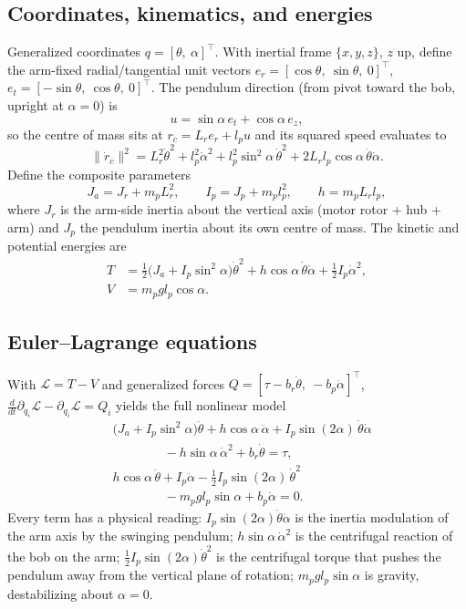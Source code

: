 \documentclass[conference]{IEEEtran}
\begin{document}
\subsection{Coordinates, kinematics, and energies}
Generalized coordinates $q = [\theta,\ \alpha]^{\!\top}$. With inertial frame $\{x,y,z\}$, $z$ up, define the arm-fixed radial/tangential unit vectors $e_r = [\cos\theta,\ \sin\theta,\ 0]^{\!\top}$, $e_t = [-\sin\theta,\ \cos\theta,\ 0]^{\!\top}$. The pendulum direction (from pivot toward the bob, upright at $\alpha=0$) is
\begin{equation}
u = \sin\alpha\, e_t + \cos\alpha\, e_z ,
\end{equation}
so the centre of mass sits at $r_c = L_r e_r + l_p u$ and its squared speed evaluates to
\begin{equation}
\|\dot r_c\|^2 = L_r^2\dot\theta^2 + l_p^2\dot\alpha^2 + l_p^2\sin^2\!\alpha\,\dot\theta^2 + 2L_r l_p\cos\alpha\,\dot\theta\dot\alpha .
\end{equation}
Define the composite parameters
\begin{equation}
J_a = J_r + m_p L_r^2,\qquad
I_p = J_p + m_p l_p^2,\qquad
h = m_p L_r l_p,
\label{eq:composite}
\end{equation}
where $J_r$ is the arm-side inertia about the vertical axis (motor rotor + hub + arm) and $J_p$ the pendulum inertia about its own centre of mass. The kinetic and potential energies are
\begin{align}
T &= \tfrac12\bigl(J_a + I_p\sin^2\!\alpha\bigr)\dot\theta^2 + h\cos\alpha\,\dot\theta\dot\alpha + \tfrac12 I_p\dot\alpha^2, \label{eq:T}\\
V &= m_p g l_p \cos\alpha .\label{eq:V}
\end{align}

\subsection{Euler--Lagrange equations}
With $\mathcal L = T - V$ and generalized forces $Q = [\tau - b_r\dot\theta,\ -b_p\dot\alpha]^{\!\top}$, $\frac{d}{dt}\partial_{\dot q_i}\mathcal L - \partial_{q_i}\mathcal L = Q_i$ yields the full nonlinear model
\begin{align}
&\bigl(J_a + I_p\sin^2\!\alpha\bigr)\ddot\theta + h\cos\alpha\,\ddot\alpha
+ I_p\sin(2\alpha)\,\dot\theta\dot\alpha \nonumber\\
&\qquad\qquad - h\sin\alpha\,\dot\alpha^2 + b_r\dot\theta = \tau,
\label{eq:nl1}\\[2pt]
&h\cos\alpha\,\ddot\theta + I_p\ddot\alpha - \tfrac12 I_p\sin(2\alpha)\,\dot\theta^2 \nonumber\\
&\qquad\qquad - m_p g l_p\sin\alpha + b_p\dot\alpha = 0 .
\label{eq:nl2}
\end{align}
Every term has a physical reading: $I_p\sin(2\alpha)\dot\theta\dot\alpha$ is the inertia modulation of the arm axis by the swinging pendulum; $h\sin\alpha\,\dot\alpha^2$ is the centrifugal reaction of the bob on the arm; $\tfrac12 I_p \sin(2\alpha)\dot\theta^2$ is the centrifugal torque that pushes the pendulum away from the vertical plane of rotation; $m_p g l_p \sin\alpha$ is gravity, destabilizing about $\alpha=0$.
\end{document}
